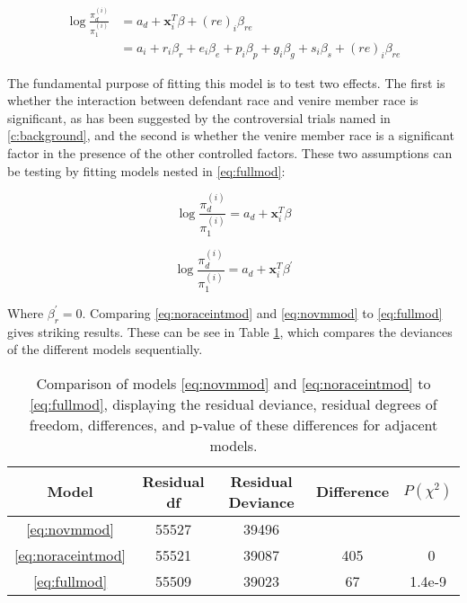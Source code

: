 \begin{equation}
  \label{eq:fullmod}
  \begin{split}
    \log \frac{\pi_d^{(i)}}{\pi_1^{(i)}} & = a_d + \mathbf{x}_i^T \beta + (re)_i \beta_{re} \\
    & = a_i + r_i \beta_r + e_i \beta_e + p_i \beta_p + g_i \beta_g + s_i \beta_s + (re)_i \beta_{re}
  \end{split}
\end{equation}

The fundamental purpose of fitting this model is to test two effects. The first is whether the interaction between defendant race
and venire member race is significant, as has been suggested by the controversial trials named in \ref{c:background}, and the
second is whether the venire member race is a significant factor in the presence of the other controlled factors. These two
assumptions can be testing by fitting models nested in \ref{eq:fullmod}:

\begin{equation}
  \label{eq:noraceintmod}
  \log \frac{\pi_d^{(i)}}{\pi_1^{(i)}} = a_d + \mathbf{x}_i^T \beta
\end{equation}

\begin{equation}
  \label{eq:novmmod}
  \log \frac{\pi_d^{(i)}}{\pi_1^{(i)}} = a_d + \mathbf{x}_i^T \beta^{\prime}
\end{equation}

Where $\beta^{\prime}_r = 0$. Comparing \ref{eq:noraceintmod} and \ref{eq:novmmod} to \ref{eq:fullmod} gives striking
results. These can be see in Table \ref{tab:modcomp}, which compares the deviances of the different models sequentially.

\begin{table}[h!]
  \centering
  \caption[Model Comparisons to Determine the Importance of
  Race]{\footnotesize Comparison of models \ref{eq:novmmod} and \ref{eq:noraceintmod}
    to \ref{eq:fullmod}, displaying the residual deviance, residual degrees of freedom, differences, and p-value of these
    differences for adjacent models.}
  \label{tab:modcomp}
  \begin{tabular}{|c|c|c|c|c|} \hline
    Model & Residual df & Residual Deviance & Difference & $P(\chi^2)$ \\ \hline
    \ref{eq:novmmod} & 55527 & 39496 &  &  \\
    \ref{eq:noraceintmod} & 55521 & 39087 & 405 & ~0 \\
    \ref{eq:fullmod} & 55509 & 39023 & 67 & 1.4e-9 \\ \hline
  \end{tabular}
\end{table}

